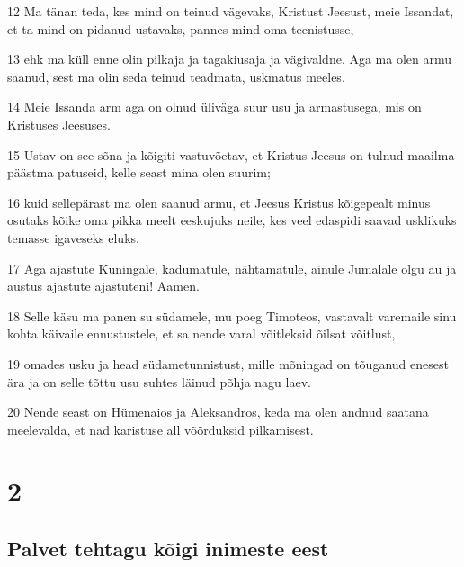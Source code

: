 \par 12 Ma tänan teda, kes mind on teinud vägevaks, Kristust Jeesust, meie Issandat, et ta mind on pidanud ustavaks, pannes mind oma teenistusse,
\par 13 ehk ma küll enne olin pilkaja ja tagakiusaja ja vägivaldne. Aga ma olen armu saanud, sest ma olin seda teinud teadmata, uskmatus meeles.
\par 14 Meie Issanda arm aga on olnud üliväga suur usu ja armastusega, mis on Kristuses Jeesuses.
\par 15 Ustav on see sõna ja kõigiti vastuvõetav, et Kristus Jeesus on tulnud maailma päästma patuseid, kelle seast mina olen suurim;
\par 16 kuid sellepärast ma olen saanud armu, et Jeesus Kristus kõigepealt minus osutaks kõike oma pikka meelt eeskujuks neile, kes veel edaspidi saavad usklikuks temasse igaveseks eluks.
\par 17 Aga ajastute Kuningale, kadumatule, nähtamatule, ainule Jumalale olgu au ja austus ajastute ajastuteni! Aamen.
\par 18 Selle käsu ma panen su südamele, mu poeg Timoteos, vastavalt varemaile sinu kohta käivaile ennustustele, et sa nende varal võitleksid õilsat võitlust,
\par 19 omades usku ja head südametunnistust, mille mõningad on tõuganud enesest ära ja on selle tõttu usu suhtes läinud põhja nagu laev.
\par 20 Nende seast on Hümenaios ja Aleksandros, keda ma olen andnud saatana meelevalda, et nad karistuse all võõrduksid pilkamisest.


\chapter{2}

\section*{Palvet tehtagu kõigi inimeste eest}

